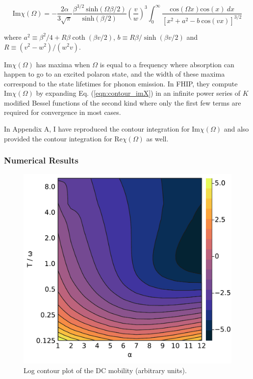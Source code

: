 \begin{equation}\label{eqn:contour_imX}
    \textrm{Im}\chi(\Omega) = - \frac{2 \alpha}{3 \sqrt{\pi}} \frac{\beta^{3/2}\ \textrm{sinh}(\Omega \beta / 2)}{\textrm{sinh}(\beta / 2)} \left( \frac{v}{w} \right)^3 \int_0^\infty \frac{\textrm{cos}(\Omega x) \textrm{cos}(x)\ dx}{\left[x^2 + a^2 - b\ \textrm{cos}(vx) \right]^{3/2}}
\end{equation}

where $a^2 \equiv \beta^2 / 4 + R \beta \coth (\beta v / 2)$, $b \equiv R\beta / \sinh(\beta v / 2)$ and $R \equiv (v^2 - w^2) / (w^2 v)$. 

$\text{Im} \chi(\Omega)$ has maxima when $\Omega$ is equal to a frequency where absorption can happen to go to an excited polaron state, and the width of these maxima correspond to the state lifetimes for phonon emission. In FHIP, they compute $\text{Im}\chi(\Omega)$ by expanding Eq. (\ref{eqn:contour_imX}) in an infinite power series of $K$ modified Bessel functions of the second kind where only the first few terms are required for convergence in most cases.  

In Appendix A, I have reproduced the contour integration for $\text{Im}\chi(\Omega)$ and also provided the contour integration for $\text{Re}\chi(\Omega)$ as well.

\subsubsection{Numerical Results}

\begin{figure}[t]
    \centering
    \includegraphics[width=.7\textwidth]{figures/dc_mobility.pdf}
    \caption{Log contour plot of the DC mobility (arbitrary units).}
    \label{fig:dcmobility}
\end{figure}

